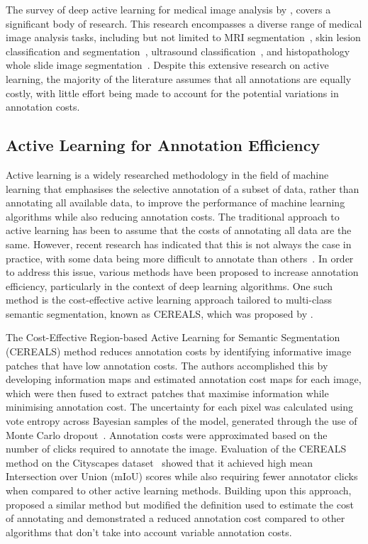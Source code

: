 The survey of deep active learning for medical image analysis by \cite{budd2021survey}, covers a significant body of research. This research encompasses a diverse range of medical image analysis tasks, including but not limited to MRI segmentation~\citep{konyushkova2019geometry,zhao2019data}, skin lesion classification and segmentation~\citep{shi2019active, gorriz2017cost}, ultrasound classification~\cite{liu2020semi}, and histopathology whole slide image segmentation~\citep{folmsbee2021whole, jin2021reducing}. Despite this extensive research on active learning, the majority of the literature assumes that all annotations are equally costly, with little effort being made to account for the potential variations in annotation costs.

\subsection{Active Learning for Annotation Efficiency}
\label{subsec:active_annotation_efficiency}
Active learning is a widely researched methodology in the field of machine learning that emphasises the selective annotation of a subset of data, rather than annotating all available data, to improve the performance of machine learning algorithms while also reducing annotation costs. The traditional approach to active learning has been to assume that the costs of annotating all data are the same. However, recent research has indicated that this is not always the case in practice, with some data being more difficult to annotate than others~\citep{settles2008active}. In order to address this issue, various methods have been proposed to increase annotation efficiency, particularly in the context of deep learning algorithms. One such method is the cost-effective active learning approach tailored to multi-class semantic segmentation, known as CEREALS, which was proposed by \cite{mackowiak2018cereals}.

The Cost-Effective Region-based Active Learning for Semantic Segmentation (CEREALS) method reduces annotation costs by identifying informative image patches that have low annotation costs. The authors accomplished this by developing information maps and estimated annotation cost maps for each image, which were then fused to extract patches that maximise information while minimising annotation cost. The uncertainty for each pixel was calculated using vote entropy across Bayesian samples of the model, generated through the use of Monte Carlo dropout~\citep{gal2016dropout}. Annotation costs were approximated based on the number of clicks required to annotate the image. Evaluation of the CEREALS method on the Cityscapes dataset~\citep{cordts2016cityscapes} showed that it achieved high mean Intersection over Union (mIoU) scores while also requiring fewer annotator clicks when compared to other active learning methods. Building upon this approach, \cite{colling2020metabox+} proposed a similar method but modified the definition used to estimate the cost of annotating and demonstrated a reduced annotation cost compared to other algorithms that don’t take into account variable annotation costs.



